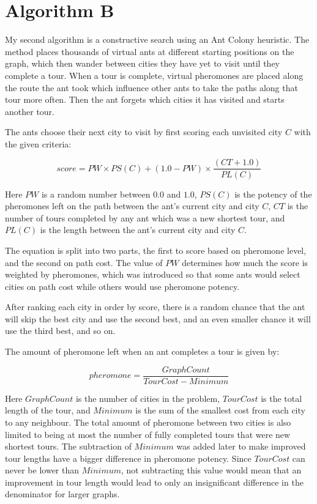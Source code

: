 \documentclass[a4paper,11pt]{article}
\begin{document}
\section{Algorithm B}
My second algorithm is a constructive search using an Ant Colony heuristic.
The method places thousands of virtual ants at different starting positions on
the graph, which then wander between cities they have yet to visit until they
complete a tour. When a tour is complete, virtual pheromones are placed along
the route the ant took which influence other ants to take the paths along that
tour more often. Then the ant forgets which cities it has visited and starts
another tour.

The ants choose their next city to visit by first scoring each unvisited city
$C$ with the given criteria:

$$score = PW \times PS(C)+(1.0 - PW) \times \frac{(CT + 1.0)}{PL(C)}$$

Here $PW$ is a random number between $0.0$ and $1.0$,
$PS(C)$ is the potency of the pheromones left on the path between
the ant's current city and city $C$, $CT$ is the number of tours
completed by any ant which was a new shortest tour, and $PL(C)$ is the
length between the ant's current city and city $C$.

The equation is split into two parts, the first to score based on pheromone
level, and the second on path cost. The value of $PW$ determines how much the
score is weighted by pheromones, which was introduced so that some ants would
select cities on path cost while others would use pheromone potency.

After ranking each city in order by score, there is a random chance that the
ant will skip the best city and use the second best, and an even smaller chance
it will use the third best, and so on.

The amount of pheromone left when an ant completes a tour is given by:

$$pheromone = \frac{GraphCount}{TourCost - Minimum}$$

Here $GraphCount$ is the number of cities in the problem, $TourCost$ is the
total length of the tour, and $Minimum$ is the sum of the smallest cost from
each city to any neighbour. The total amount of pheromone between two cities is
also limited to being at most the number of fully completed tours that were new
shortest tours. The subtraction of $Minimum$ was added later to make improved
tour lengths have a bigger difference in pheromone potency. Since $TourCost$
can never be lower than $Minimum$, not subtracting this value would mean that
an improvement in tour length would lead to only an insignificant difference in
the denominator for larger graphs.
\end{document}
